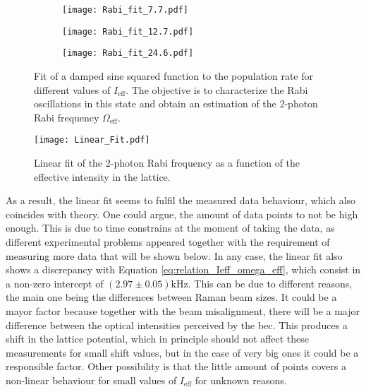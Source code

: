 \begin{figure}[!htbp]
	\centering
	\begin{subfigure}{1.\textwidth}
		\centering
		\label{fig:fig:Bragg_fit_1st_order_7.7}
		\texttt{[image: Rabi\_fit\_7.7.pdf]}
	\end{subfigure}%
	\hfill
	\vspace{0.2cm}
	\begin{subfigure}{1.\textwidth}
		\centering
		\label{fig:Bragg_fit_1st_order_12.7}
		\texttt{[image: Rabi\_fit\_12.7.pdf]}
	\end{subfigure}
	\hfill
	\vspace{0.2cm}
	\begin{subfigure}{1.\textwidth}
		\centering
		\label{fig:Bragg_fit_1st_order_24.6}
		\texttt{[image: Rabi\_fit\_24.6.pdf]}
	\end{subfigure}
	\caption[Fit of a damped sine squared function to the population rate for different values of $I_\text{eff}$]{Fit of a damped sine squared function to the population rate for different values of $I_\text{eff}$. The objective is to characterize the Rabi oscillations in this state and obtain an estimation of the 2-photon Rabi frequency $\Omega_\text{eff}$.}
	\label{fig:Bragg_fit_1st_order}
\end{figure}

\begin{figure}[!htbp]\centering
	\texttt{[image: Linear\_Fit.pdf]}
	\caption[Linear fit of the 2-photon Rabi frequency as a function of the effective intensity in the lattice]{Linear fit of the 2-photon Rabi frequency as a function of the effective intensity in the lattice.}\label{fig:Linear_fit}
\end{figure}

\newpage

As a result, the linear fit seems to fulfil the measured data behaviour, which also coincides with theory. One could argue, the amount of data points to not be high enough. This is due to time constrains at the moment of taking the data, as different experimental problems appeared together with the requirement of measuring more data that will be shown below. In any case, the linear fit also shows a discrepancy with Equation \eqref{eq:relation_Ieff_omega_eff}, which consist in a non-zero intercept of $(2.97\pm0.05)\si{\kilo\hertz}$. This can be due to different reasons, the main one being the differences between Raman beam sizes. It could be a mayor factor because together with the beam misalignment, there will be a major difference between the optical intensities perceived by the \ac{bec}. This produces a shift in the lattice potential, which in principle should not affect these measurements for small shift values, but in the case of very big ones it could be a responsible factor. Other possibility is that the little amount of points covers a non-linear behaviour for small values of $I_\text{eff}$ for unknown reasons. 

